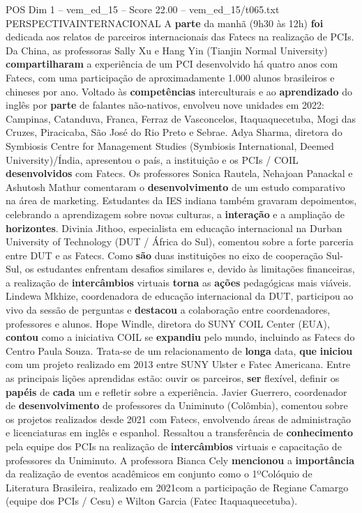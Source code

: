 \begin{textsample}{POS Dim 1 – vem\_ed\_15 – Score 22.00 – vem\_ed\_15/t065.txt}  \label{ex:f1_pos_097}
PERSPECTIVAINTERNACIONAL A \textbf{parte} da manhã (9h30 às 12h) \textbf{foi} dedicada aos relatos de parceiros internacionais das Fatecs na realização de PCIs.
Da China, as professoras Sally Xu e Hang Yin (Tianjin Normal University) \textbf{compartilharam} a experiência de um PCI desenvolvido há quatro anos com Fatecs, com uma participação de aproximadamente 1.000 alunos brasileiros e chineses por ano.
Voltado às \textbf{competências} interculturais e ao \textbf{aprendizado} do inglês por \textbf{parte} de falantes não-nativos, envolveu nove unidades em 2022: Campinas, Catanduva, Franca, Ferraz de Vasconcelos, Itaquaquecetuba, Mogi das Cruzes, Piracicaba, São José do Rio Preto e Sebrae.
Adya Sharma, diretora do Symbiosis Centre for Management Studies (Symbiosis International, Deemed University)/Índia, apresentou o país, a instituição e os PCIs / COIL \textbf{desenvolvidos} com Fatecs.
Os professores Sonica Rautela, Nehajoan Panackal e Ashutosh Mathur comentaram o \textbf{desenvolvimento} de um estudo comparativo na área de marketing.
Estudantes da IES indiana também gravaram depoimentos, celebrando a aprendizagem sobre novas culturas, a \textbf{interação} e a ampliação de \textbf{horizontes}.
Divinia Jithoo, especialista em educação internacional na Durban University of Technology (DUT / África do Sul), comentou sobre a forte parceria entre DUT e as Fatecs.
Como \textbf{são} duas instituições no eixo de cooperação Sul-Sul, os estudantes enfrentam desafios similares e, devido às limitações financeiras, a realização de \textbf{intercâmbios} virtuais \textbf{torna} as \textbf{ações} pedagógicas mais viáveis.
Lindewa Mkhize, coordenadora de educação internacional da DUT, participou ao vivo da sessão de perguntas e \textbf{destacou} a colaboração entre coordenadores, professores e alunos.
Hope Windle, diretora do SUNY COIL Center (EUA), \textbf{contou} como a iniciativa COIL se \textbf{expandiu} pelo mundo, incluindo as Fatecs do Centro Paula Souza.
Trata-se de um relacionamento de \textbf{longa} data, \textbf{que} \textbf{iniciou} com um projeto realizado em 2013 entre SUNY Ulster e Fatec Americana.
Entre as principais lições aprendidas estão: ouvir os parceiros, \textbf{ser} flexível, definir os \textbf{papéis} de \textbf{cada} um e refletir sobre a experiência.
Javier Guerrero, coordenador de \textbf{desenvolvimento} de professores da Uniminuto (Colômbia), comentou sobre os projetos realizados desde 2021 com Fatecs, envolvendo áreas de administração e licenciaturas em inglês e espanhol.
Ressaltou a transferência de \textbf{conhecimento} pela equipe dos PCIs na realização de \textbf{intercâmbios} virtuais e capacitação de professores da Uniminuto.
A professora Bianca Cely \textbf{mencionou} a \textbf{importância} da realização de eventos acadêmicos em conjunto como o 1ºColóquio de Literatura Brasileira, realizado em 2021com a participação de Regiane Camargo (equipe dos PCIs / Cesu) e Wilton Garcia (Fatec Itaquaquecetuba).

\end{textsample}
